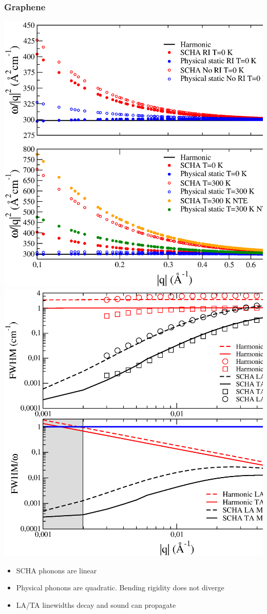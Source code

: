 \documentclass{beamer}
\begin{document}
\begin{frame}

\frametitle{Graphene}
\begin{center}
 \includegraphics[width=0.49\linewidth]{Pictures/Graphene/membrane.eps}
 \includegraphics[width=0.49\linewidth]{Pictures/Graphene/lwmembrane.eps}
\end{center}
\begin{itemize}
 \item SCHA phonons are linear
 \item Physical phonons are quadratic. Bending rigidity does not diverge
 \item LA/TA linewidths decay and sound can propagate
\end{itemize}

\end{frame}

\end{document}
